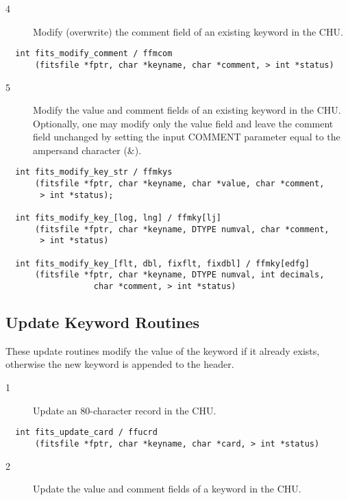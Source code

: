 \begin{description}
\item[4 ] Modify (overwrite) the comment field of an existing keyword in the CHU.
\end{description}

\begin{verbatim}
  int fits_modify_comment / ffmcom
      (fitsfile *fptr, char *keyname, char *comment, > int *status)
\end{verbatim}

\begin{description}
\item[5 ] Modify the value and comment fields of an existing keyword in the CHU.
    Optionally, one may modify only the value field and leave the comment
    field unchanged by setting the input COMMENT parameter equal to
   the ampersand character (\&).
\end{description}

\begin{verbatim}
  int fits_modify_key_str / ffmkys
      (fitsfile *fptr, char *keyname, char *value, char *comment,
       > int *status);

  int fits_modify_key_[log, lng] / ffmky[lj]
      (fitsfile *fptr, char *keyname, DTYPE numval, char *comment,
       > int *status)

  int fits_modify_key_[flt, dbl, fixflt, fixdbl] / ffmky[edfg]
      (fitsfile *fptr, char *keyname, DTYPE numval, int decimals,
                  char *comment, > int *status)
\end{verbatim}

\subsection{ Update Keyword Routines \label{FFUCRD}}

These update routines modify the value of the keyword if it already exists,
otherwise the new keyword is appended to the header.


\begin{description}
\item[1 ] Update an 80-character record in the CHU.
\end{description}

\begin{verbatim}
  int fits_update_card / ffucrd
      (fitsfile *fptr, char *keyname, char *card, > int *status)
\end{verbatim}

\begin{description}
\item[2 ] Update the value and comment fields of a keyword in the CHU.
\end{description}

